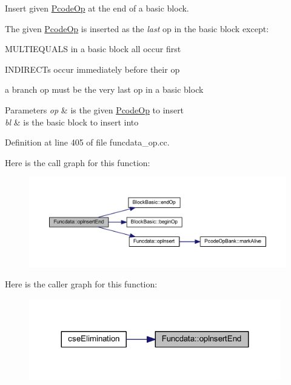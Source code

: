 Insert given \mbox{\hyperlink{class_pcode_op}{Pcode\+Op}} at the end of a basic block. 

The given \mbox{\hyperlink{class_pcode_op}{Pcode\+Op}} is inserted as the {\itshape last} op in the basic block except\+:
\begin{DoxyItemize}
\item M\+U\+L\+T\+I\+E\+Q\+U\+A\+LS in a basic block all occur first
\item I\+N\+D\+I\+R\+E\+C\+Ts occur immediately before their op
\item a branch op must be the very last op in a basic block
\end{DoxyItemize}


\begin{DoxyParams}{Parameters}
{\em op} & is the given \mbox{\hyperlink{class_pcode_op}{Pcode\+Op}} to insert \\
\hline
{\em bl} & is the basic block to insert into \\
\hline
\end{DoxyParams}


Definition at line 405 of file funcdata\+\_\+op.\+cc.

Here is the call graph for this function\+:
\nopagebreak
\begin{figure}[H]
\begin{center}
\leavevmode
\includegraphics[width=350pt]{class_funcdata_ad544a6136ff019bbd18c45043e9b6900_cgraph}
\end{center}
\end{figure}
Here is the caller graph for this function\+:
\nopagebreak
\begin{figure}[H]
\begin{center}
\leavevmode
\includegraphics[width=311pt]{class_funcdata_ad544a6136ff019bbd18c45043e9b6900_icgraph}
\end{center}
\end{figure}
\mbox{\label{class_funcdata_ab34e641f5ee6f2ebf4aa708e21f2b24c}} 
